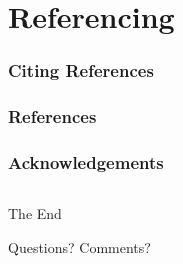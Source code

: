 \documentclass[
  11pt, %
  xcolor=dvipsnames
]{beamer}
\begin{document}
\section{Referencing}

\begin{frame}
	\frametitle{Citing References}

	\bigskip %

\end{frame}


\begin{frame} %
	\frametitle{References}

	\begin{thebibliography}{99} %
		\footnotesize %

	\end{thebibliography}
\end{frame}


\begin{frame}
	\frametitle{Acknowledgements}

	\begin{columns}[t] %
		\begin{column}{0.45\textwidth} %
		\end{column}
		\begin{column}{0.5\textwidth} %
		\end{column}
	\end{columns}
\end{frame}


\begin{frame}[plain] %
	\begin{center}
		{\Huge The End}

		\bigskip\bigskip %

		{\LARGE Questions? Comments?}
	\end{center}
\end{frame}

\end{document}
